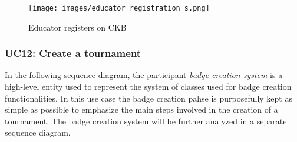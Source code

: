 \documentclass[a4paper, 11pt, titlepage]{article}
\begin{document}
\begin{figure}[h!]
    \centering
    \texttt{[image: images/educator\_registration\_s.png]}
    \caption{Educator registers on CKB}
    \label{fig:seq_diag_educator_reg}
    
\end{figure}

\clearpage

\subsubsection*{UC12: Create a tournament}
In the following sequence diagram, the participant \textit{badge creation system} is a high-level entity used to 
represent the system of classes used for badge creation functionalities. In this use case the badge creation pahse is purposefully kept as simple as possible to 
emphasize the main steps involved in the creation of a tournament. The badge creation system will be further analyzed in a separate sequence diagram.
\end{document}
